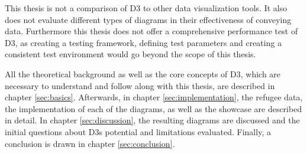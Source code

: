 This thesis is not a comparison of D3 to other data visualization tools. It also does not evaluate different types of diagrams in their effectiveness of conveying data. Furthermore this thesis does not offer a comprehensive performance test of D3, as creating a testing framework, defining test parameters and creating a consistent test environment would go beyond the scope of this thesis.

All the theoretical background as well as the core concepts of D3, which are necessary to understand and follow along with this thesis, are described in chapter \ref{sec:basics}. Afterwards, in chapter \ref{sec:implementation}, the refugee data, the implementation of each of the diagrams, as well as the showcase are described in detail. In chapter \ref{sec:discussion}, the resulting diagrams are discussed and the initial questions about D3s potential and limitations evaluated. Finally, a conclusion is drawn in chapter \ref{sec:conclusion}.
